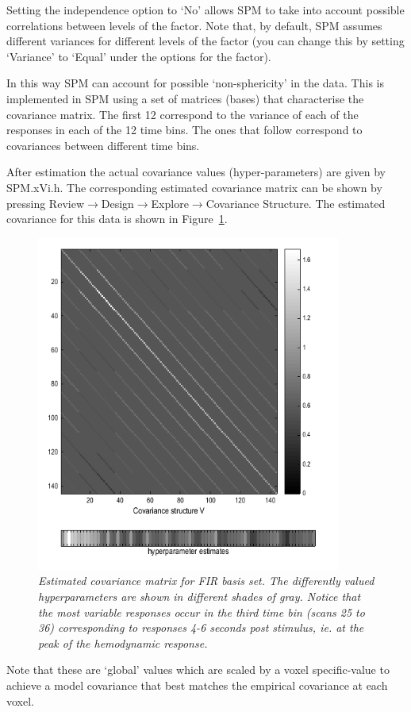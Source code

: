 Setting the independence option to `No' allows SPM to take into account possible correlations between levels of the factor. Note that, by default, SPM assumes different variances 
for different levels of the factor (you can change this by setting `Variance' to `Equal' under the options for the factor). 

In this way SPM can account for possible `non-sphericity' in the data. This is implemented in SPM using a set of matrices (bases) that characterise the covariance matrix. The first 12 correspond to the variance of each of the responses in 
each of the 12 time bins. The ones that follow  correspond to covariances between different time bins.

After estimation the actual covariance values (hyper-parameters) are given by SPM.xVi.h. The corresponding estimated 
covariance matrix can be shown by pressing Review$\rightarrow$Design$\rightarrow$Explore$\rightarrow$Covariance Structure. The estimated covariance for this data is shown in Figure~\ref{fir_covariance}.
\begin{figure}
\begin{center}
\includegraphics[width=100mm]{fir_covariance}
\caption{\em Estimated covariance matrix for FIR basis set. The differently valued hyperparameters are shown in different shades of gray. Notice that the most variable responses occur in the third time bin (scans 25 to 36) corresponding to responses 4-6 seconds post stimulus, ie. at the peak of the hemodynamic response. \label{fir_covariance}}
\end{center}
\end{figure}
Note that these are `global' values which are scaled by a voxel specific-value to achieve a model covariance that best matches the empirical covariance at each voxel. 

